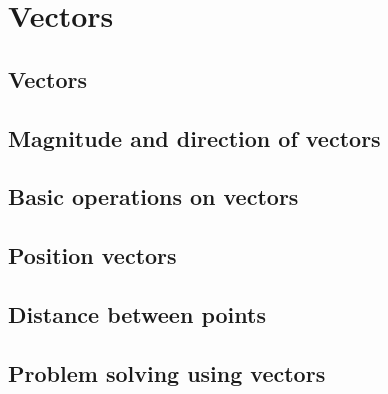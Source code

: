\chapter{Vectors}
\section{Vectors}
\section{Magnitude and direction of vectors}
\section{Basic operations on vectors}
\section{Position vectors}
\section{Distance between points}
\section{Problem solving using vectors}